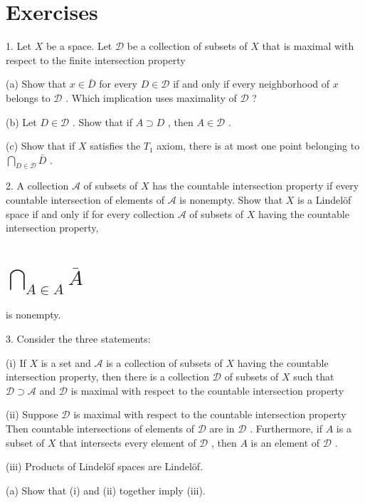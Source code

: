 \section*{Exercises}

1. Let \(X\) be a space. Let \(\mathcal{D}\) be a collection of subsets of \(X\) that is maximal with respect to the finite intersection property

(a) Show that \(x \in  \bar{D}\) for every \(D \in  \mathcal{D}\) if and only if every neighborhood of \(x\) belongs to \(\mathcal{D}\) . Which implication uses maximality of \(\mathcal{D}\) ?

(b) Let \(D \in  \mathcal{D}\) . Show that if \(A \supset  D\) , then \(A \in  \mathcal{D}\) .

(c) Show that if \(X\) satisfies the \({T}_{1}\) axiom, there is at most one point belonging to \(\mathop{\bigcap }\limits_{{D \in  \mathcal{D}}}\bar{D}\) .

2. A collection \(\mathcal{A}\) of subsets of \(X\) has the countable intersection property if every countable intersection of elements of \(\mathcal{A}\) is nonempty. Show that \(X\) is a Lindelöf space if and only if for every collection \(\mathcal{A}\) of subsets of \(X\) having the countable intersection property,

\section*{\(\mathop{\bigcap }\limits_{{A \in  A}}\bar{A}\)}

is nonempty.

3. Consider the three statements:

(i) If \(X\) is a set and \(\mathcal{A}\) is a collection of subsets of \(X\) having the countable intersection property, then there is a collection \(\mathcal{D}\) of subsets of \(X\) such that \(\mathcal{D} \supset  \mathcal{A}\) and \(\mathcal{D}\) is maximal with respect to the countable intersection property

(ii) Suppose \(\mathcal{D}\) is maximal with respect to the countable intersection property Then countable intersections of elements of \(\mathcal{D}\) are in \(\mathcal{D}\) . Furthermore, if \(A\) is a subset of \(X\) that intersects every element of \(\mathcal{D}\) , then \(A\) is an element of \(\mathcal{D}\) .

(iii) Products of Lindelöf spaces are Lindelöf.

(a) Show that (i) and (ii) together imply (iii).

